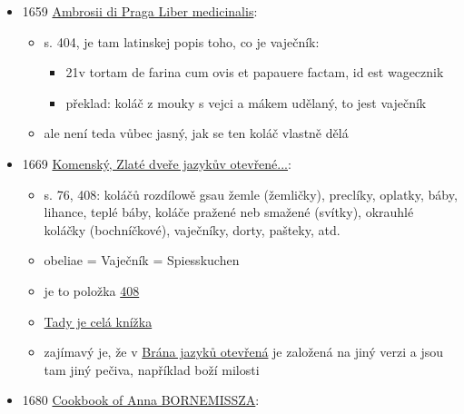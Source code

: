 \begin{itemize}
  \begin{itemize}
  \tightlist
  \item
    Jan Amos Komenský
  \item
    latinsko-německé vydání
  \item
    s. 37:

    \begin{itemize}
    \tightlist
    \item
      Spiras \& placentas praeter obelias \& teganitas
    \item
      Pretzeln (Kringel) und Kuchen / ohn (aufferhalb) die Spiesskuchen
      und Pfannkuchen
    \end{itemize}
  \end{itemize}
\item
  1659
  \href{https://ceskadigitalniknihovna.cz/uuid/uuid:d380c040-c80a-11ea-b7a2-005056827e51}{Ambrosii
  di Praga Liber medicinalis}:

  \begin{itemize}
  \tightlist
  \item
    s. 404, je tam latinskej popis toho, co je vaječník:

    \begin{itemize}
    \tightlist
    \item
      21v tortam de farina cum ovis et papauere factam, id est wagecznik
    \item
      překlad: koláč z mouky s vejci a mákem udělaný, to jest vaječník
    \end{itemize}
  \item
    ale není teda vůbec jasný, jak se ten koláč vlastně dělá
  \end{itemize}
\item
  1669
  \href{https://vokabular.ujc.cas.cz/moduly/mluvnice/digitalni-kopie-detail/KomJanua1669/strana-76}{Komenský,
  Zlaté dveře jazykův otevřené...}:

  \begin{itemize}
  \tightlist
  \item
    s. 76, 408: koláčů rozdílowě gsau žemle (žemličky), preclíky,
    oplatky, báby, lihance, teplé báby, koláče pražené neb smažené
    (svítky), okrauhlé koláčky (bochníčkové), vaječníky, dorty, pašteky,
    atd.
  \item
    obeliae = Vaječník = Spiesskuchen
  \item
    je to položka
    \href{https://vokabular.ujc.cas.cz/moduly/mluvnice/digitalni-kopie-detail/KomJanua1669/strana-76}{408}
  \item
    \href{https://vokabular.ujc.cas.cz/moduly/mluvnice/digitalni-kopie-info/KomJanua1669}{Tady
    je celá knížka}
  \item
    zajímavý je, že v
    \href{https://www.digitalniknihovna.cz/mzk/uuid/uuid:c53f79b0-b747-11e4-a7a2-005056827e51}{Brána
    jazyků otevřená} je založená na jiný verzi a jsou tam jiný pečiva,
    například boží milosti
  \end{itemize}
\item
  1680 \href{http://www.kurtos.eu/dl/bornemissza.pdf}{Cookbook of Anna
  BORNEMISSZA}:


\end{itemize}

